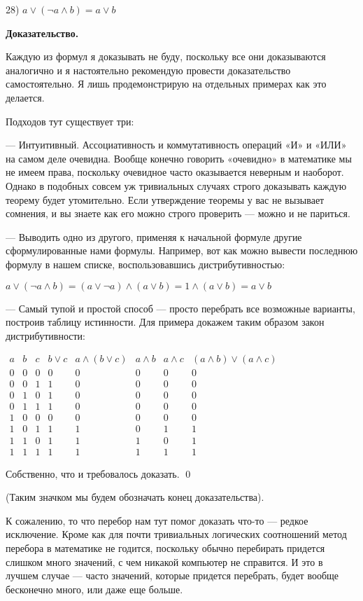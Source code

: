 28) $a \vee (\neg a \wedge b) = a \vee b$

{\bfseries Доказательство.}

Каждую из формул я доказывать не буду, поскольку все они доказываются аналогично и я настоятельно рекомендую провести доказательство самостоятельно. Я лишь продемонстрирую на отдельных примерах как это делается.

Подходов тут существует три:

— Интуитивный. Ассоциативность и коммутативность операций «И» и «ИЛИ» на самом деле очевидна. Вообще конечно говорить «очевидно» в математике мы не имеем права, поскольку очевидное часто оказывается неверным и наоборот. Однако в подобных совсем уж тривиальных случаях строго доказывать каждую теорему будет утомительно. Если утверждение теоремы у вас не вызывает сомнения, и вы знаете как его можно строго проверить — можно и не париться.

— Выводить одно из другого, применяя к начальной формуле другие сформулированные нами формулы. Например, вот как можно вывести последнюю формулу в нашем списке, воспользовавшись дистрибутивностью:

$a \vee (\neg a \wedge b) = (a \vee \neg a) \wedge (a \vee b) = 1 \wedge (a \vee b) = a \vee b$

— Самый тупой и простой способ — просто перебрать все возможные варианты, построив таблицу истинности. Для примера докажем таким образом закон дистрибутивности:

$\begin{array}{ccc|cc|ccc}a&b&c&b\vee c&a\wedge(b\vee c)&a\wedge b&a\wedge c&(a\wedge b)\vee(a\wedge c)\\ \hline 0&0&0&0&0&0&0&0\\0&0&1&1&0&0&0&0\\0&1&0&1&0&0&0&0\\0&1&1&1&0&0&0&0\\1&0&0&0&0&0&0&0\\1&0&1&1&1&0&1&1\\1&1&0&1&1&1&0&1\\1&1&1&1&1&1&1&1\end{array}$

Собственно, что и требовалось доказать. \qed

(Таким значком мы будем обозначать конец доказательства).

К сожалению, то что перебор нам тут помог доказать что-то — редкое исключение. Кроме как для почти тривиальных логических соотношений метод перебора в математике не годится, поскольку обычно перебирать придется слишком много значений, с чем никакой компьютер не справится. И это в лучшем случае — часто значений, которые придется перебрать, будет вообще бесконечно много, или даже еще больше.

